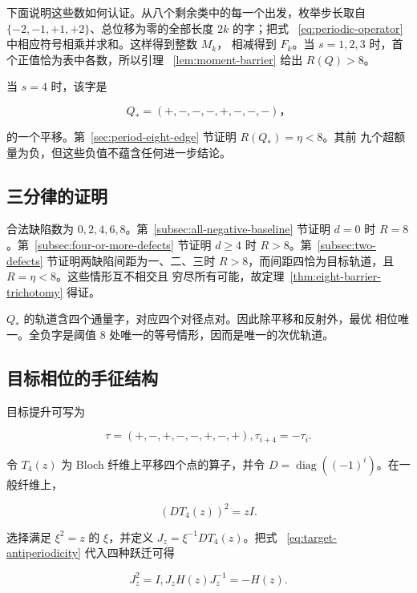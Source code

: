 下面说明这些数如何认证。从八个剩余类中的每一个出发，枚举步长取自
\(\{-2,-1,+1,+2\}\)、总位移为零的全部长度 \(2k\) 的字；把式~
\eqref{eq:periodic-operator} 中相应符号相乘并求和。这样得到整数 \(M_k\)，
相减得到 \(F_k\)。当 \(s=1,2,3\) 时，首个正值恰为表中各数，所以引理~
\ref{lem:moment-barrier} 给出 \(R(Q)>8\)。

当 \(s=4\) 时，该字是

\begin{equation}
Q_*=(+,-,-,-,+,-,-,-)\text{，}
\end{equation}

的一个平移。第~\ref{sec:period-eight-edge} 节证明 \(R(Q_*)=\eta<8\)。其前
九个超额量为负，但这些负值不蕴含任何进一步结论。

\subsection{三分律的证明}

合法缺陷数为 \(0,2,4,6,8\)。第~\ref{subsec:all-negative-baseline} 节证明
\(d=0\) 时 \(R=8\)。第~\ref{subsec:four-or-more-defects} 节证明 \(d\geq4\)
时 \(R>8\)。第~\ref{subsec:two-defects} 节证明两缺陷间距为一、二、三时
\(R>8\)，而间距四恰为目标轨道，且 \(R=\eta<8\)。这些情形互不相交且
穷尽所有可能，故定理~\ref{thm:eight-barrier-trichotomy} 得证。

\(Q_*\) 的轨道含四个通量字，对应四个对径点对。因此除平移和反射外，最优
相位唯一。全负字是阈值 8 处唯一的等号情形，因而是唯一的次优轨道。

\subsection{目标相位的手征结构}

目标提升可写为

\begin{equation}
\label{eq:target-antiperiodicity}
\tau=(+,-,+,-,-,+,-,+),       \tau_{i+4}=-\tau_i.
\end{equation}

令 \(T_4(z)\) 为 Bloch 纤维上平移四个点的算子，并令
\(D=\operatorname{diag}((-1)^i)\)。在一般纤维上，

\begin{equation}
(D T_{4}(z))^{2}=zI.
\end{equation}

选择满足 \(\xi^2=z\) 的 \(\xi\)，并定义 \(J_z=\xi^{-1}DT_4(z)\)。把式~
\eqref{eq:target-antiperiodicity} 代入四种跃迁可得

\begin{equation}
\label{eq:chiral-symmetry}
J_z^{2}=I,       J_z H(z)J_z^{-1}=-H(z).
\end{equation}

